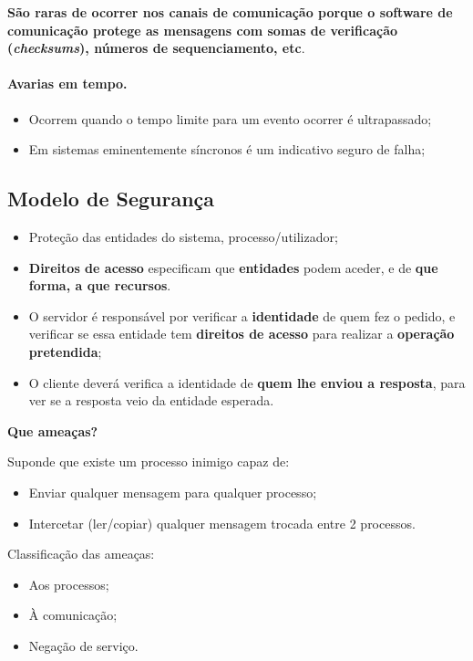 \documentclass{article}
\begin{document}
\textbf{São raras de ocorrer nos canais de comunicação porque o software de comunicação protege as mensagens com somas de verificação (\textit{checksums}), números de sequenciamento, etc}.

\paragraph{Avarias em tempo.}

\begin{itemize}
	\item Ocorrem quando o tempo limite para um evento ocorrer é ultrapassado;
	\item Em sistemas eminentemente síncronos é um indicativo seguro de falha;
\end{itemize}

\subsection{Modelo de Segurança}

\begin{itemize}
	\item Proteção das entidades do sistema, processo/utilizador;
	\item \textbf{Direitos de acesso} especificam que \textbf{entidades} podem aceder, e de \textbf{que forma, a que recursos}.
	\item O servidor é responsável por verificar a \textbf{identidade} de quem fez o pedido, e verificar se essa entidade tem \textbf{direitos de acesso} para realizar a \textbf{operação pretendida};
	\item O cliente deverá verifica a identidade de \textbf{quem lhe enviou a resposta}, para ver se a resposta veio da entidade esperada.
\end{itemize}

\textbf{Que ameaças?}

Suponde que existe um processo inimigo capaz de:

\begin{itemize}
	\item Enviar qualquer mensagem para qualquer processo;
	\item Intercetar (ler/copiar) qualquer mensagem trocada entre 2 processos.
\end{itemize}

Classificação das ameaças:

\begin{itemize}
	\item Aos processos;
	\item À comunicação;
	\item Negação de serviço.
\end{itemize}
\end{document}
